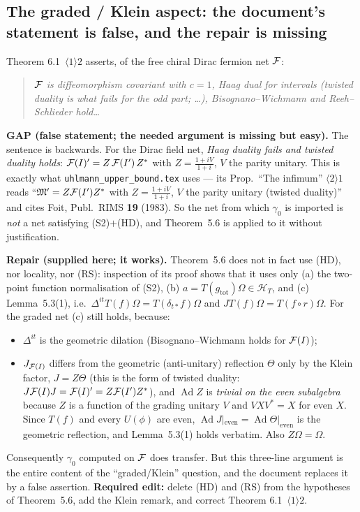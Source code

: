 \documentclass[11pt]{article}
\newcommand{\HT}{\mathcal H_T}
\newcommand{\Ad}{\operatorname{Ad}}
\newcommand{\Om}{\Omega}
\newcommand{\gtot}{g_{\mathrm{tot}}}
\begin{document}
\subsection{The graded / Klein aspect: the document's statement is false, and the repair is missing}
\label{r:klein}

Theorem 6.1~$\langle1\rangle2$ asserts, of the free chiral Dirac fermion net $\mathcal F$:
\begin{quote}\itshape
$\mathcal F$ is diffeomorphism covariant with $c=1$, Haag dual for intervals (twisted duality is what fails for the
\emph{odd} part; \dots), Bisognano--Wichmann and Reeh--Schlieder hold\dots
\end{quote}

\begin{verdictgap}
\textbf{GAP (false statement; the needed argument is missing but easy).}  The sentence is backwards.  For the
Dirac field net, \emph{Haag duality fails and twisted duality holds}:
$\mathcal F(I)'=Z\,\mathcal F(I')\,Z^*$ with $Z=\frac{1+iV}{1+i}$, $V$ the parity unitary.  This is exactly what
\texttt{uhlmann\_upper\_bound.tex} uses --- its Prop.~``The infimum'' $\langle2\rangle1$ reads
``$\mathfrak M'=Z\mathcal F(I')Z^*$ with $Z=\frac{1+iV}{1+i}$, $V$ the parity unitary (twisted duality)'' and cites
Foit, Publ.\ RIMS \textbf{19} (1983).  So the net from which $\gamma_0$ is imported is \emph{not} a net
satisfying (S2)$+$(HD), and Theorem~5.6 is applied to it without justification.

\textbf{Repair (supplied here; it works).}  Theorem~5.6 does not in fact use (HD), nor locality, nor (RS):
inspection of its proof shows that it uses only (a) the two-point function normalisation of (S2),
(b) $a=T(\gtot)\Om\in\HT$, and (c) Lemma~5.3(1), i.e.\ $\Delta^{it}T(f)\Om=T(\delta_{t*}f)\Om$ and
$JT(f)\Om=T(f\circ r)\Om$.  For the graded net (c) still holds, because:
\begin{itemize}[leftmargin=1.6em]
\item $\Delta^{it}$ is the geometric dilation (Bisognano--Wichmann holds for $\mathcal F(I)$);
\item $J_{\mathcal F(I)}$ differs from the geometric (anti-unitary) reflection $\Theta$ only by the Klein factor,
 $J=Z\Theta$ (this is the form of twisted duality: $J\mathcal F(I)J=\mathcal F(I)'=Z\mathcal F(I')Z^*$), and $\Ad Z$ is
 \emph{trivial on the even subalgebra} because $Z$ is a function of the grading unitary $V$ and $VXV^*=X$
 for even $X$.  Since $T(f)$ and every $U(\phi)$ are even, $\Ad J|_{\text{even}}=\Ad\Theta|_{\text{even}}$
 is the geometric reflection, and Lemma~5.3(1) holds verbatim.  Also $Z\Om=\Om$.
\end{itemize}
Consequently $\gamma_0$ computed on $\mathcal F$ does transfer.  But this three-line argument is the entire content
of the ``graded/Klein'' question, and the document replaces it by a false assertion.  \textbf{Required
edit:} delete (HD) and (RS) from the hypotheses of Theorem~5.6, add the Klein remark, and correct
Theorem 6.1~$\langle1\rangle2$.
\end{verdictgap}
\end{document}
